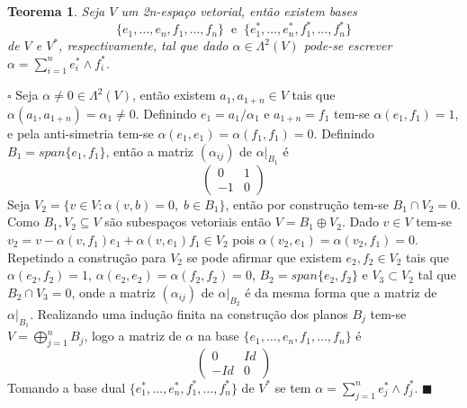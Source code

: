 \documentclass[12pt]{book}
\newtheorem{teorema}{Teorema}[section]
\newenvironment{prova}[1]{$\square$ #1}{\hfill$\blacksquare$}
\begin{document}
	\begin{teorema}
		Seja $V$ um 2n-espaço vetorial, então existem bases 
		$$
		\{ e_{1},\dots, e_{n}, f_{1},\dots, f_{n}\}\;\;\text{e}\;\;\{e_{1}^{*}, \dots, e_{n}^{*}, f_{1}^{*}, \dots,f_{n}^{*}\}
		$$
		de $V$ e $V^{*}$, respectivamente, tal que dado $\alpha \in \Lambda^{2}(V)$ pode-se escrever $\alpha = \sum_{i=1}^{n} e^{*}_{i}\wedge f^{*}_{i}$.
	\end{teorema}
	\begin{prova}
		Seja $\alpha\neq 0\in \Lambda^{2}(V) $, então existem $ a_{1}, a_{1+n} \in V $ tais que $\alpha(a_{1}, a_{1+n}) = \alpha_{1} \neq 0$. Definindo $e_{1} = a_{1}/\alpha_{1}$ e $a_{1+n} = f_{1}$ tem-se $\alpha(e_{1}, f_{1}) = 1$, e pela anti-simetria tem-se $\alpha(e_{1}, e_{1}) = \alpha(f_{1}, f_{1}) = 0$. Definindo $B_{1}=span \{e_{1}, f_{1}\}$, então a matriz $(\alpha_{ij})$ de $\alpha|_{B_{1}}$ é
		$$
		\left(
		\begin{array}{cc}
		0 & 1
		\\
		-1 & 0
		\end{array}
		\right)
		$$
		Seja  $V_{2} = \{v \in V: \alpha(v, b) = 0,\; b \in B_{1}\}$, então por construção tem-se $B_{1} \cap V_{2} = 0$. Como $B_{1}, V_{2} \subseteq V$ são subespaços vetoriais então $V = B_{1}\oplus V_{2}$. Dado $v \in V$ tem-se $v_{2} =v- \alpha(v,f_{1})e_{1} +\alpha(v,e_{1})f_{1} \in V_{2}$ pois $\alpha(v_{2}, e_{1}) = \alpha(v_{2}, f_{1}) = 0$. Repetindo a construção para $V_{2}$ se pode afirmar que existem $e_{2}, f_{2} \in V_{2}$ tais que $\alpha(e_{2}, f_{2}) = 1$, $\alpha(e_{2}, e_{2}) = \alpha(f_{2}, f_{2}) = 0$, $B_{2} = span\{e_{2}, f_{2} \}$ e $V_{3} \subset V_{2}$ tal que $B_{2}\cap V_{3}=0$, onde a matriz $(\alpha_{ij})$ de $\alpha|_{B_{2}}$ é da mesma forma que a matriz de $\alpha|_{B_{1}}$. Realizando uma indução finita na construção dos planos $B_{j}$ tem-se $V = \bigoplus_{j=1}^{n}B_{j}$, logo a matriz de $\alpha$ na base  $\{ e_{1},\dots, e_{n}, f_{1},\dots, f_{n}\}$ é
		$$
		\left(
		\begin{array}{cc}
		0 & Id
		\\
		-Id & 0
		\end{array}
		\right)
		$$
		Tomando a base dual $\{e_{1}^{*}, \dots, e_{n}^{*}, f_{1}^{*}, \dots,f_{n}^{*}\}$ de $V^{*}$ se tem $\alpha = \sum_{j=1}^{n}e_{j}^{*}\wedge f_{j}^{*}$.
	\end{prova}
	
\end{document}
